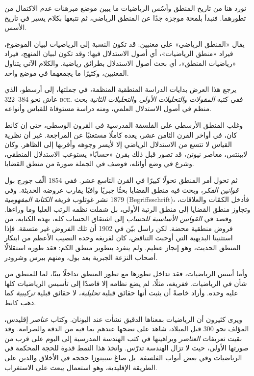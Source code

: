 \documentclass[../../../include/open-logic-section]{subfiles}
\begin{document}


نورد هنا من تاريخ المنطق وأسُس الرياضيات ما يبين موضع مبرهنات
عدم الاكتمال من تطورهما. فنبدأ بلمحة موجزة جدًا عن المنطق الرياضي،
ثم نتبعها بكلام يسير في تاريخ الأسس.

\begin{digress}
  يقال «المنطق الرياضي» على معنيين: قد تكون النسبة إلى الرياضيات
  لبيان الموضوع، فيراد «منطق الرياضيات»، أي أصول الاستدلال فيها؛
  وقد تكون لبيان المنهج، فيراد «رياضيات المنطق»، أي بحث أصول
  الاستدلال بطرائق رياضية. والكلام الآتي يتناول المعنيين، وكثيرًا
  ما يجمعهما في موضع واحد.
\end{digress}

يرجع هذا العرض بدايات الدراسة المنطقية المنظمة، في جملتها،
إلى أرسطو، الذي عاش نحو 384--322 \textsc{bce}. ففي كتبه
\emph{المقولات} و\emph{التحليلات الأولى} و\emph{التحليلات الثانية}
بحث منظم في أصول الاستدلال العلمي، ومنه دراسة مستوفاة للقياس
وأنواعه.

وغلب المنطق الأرسطي على الفلسفة المدرسية في القرون الوسطى،
حتى إن كانط كان، في أواخر القرن الثامن عشر، يعده كاملًا مستغنيًا
عن المراجعة. غير أن نظرية القياس لا تتسع من الاستدلال الرياضي
إلا لأيسر وجوهه وأقربها إلى الظاهر. وكان لايبنتس، معاصر نيوتن،
قد تصور قبل ذلك بقرن «حسابًا» يستوعب الاستدلال المنطقي، وشرع في
وضع أوائله، فوصف في الجملة صورة من منطق القضايا.

ثم تحول أمر المنطق تحولًا كبيرًا في القرن التاسع عشر. ففي
1854 ألّف جورج بول \emph{قوانين الفكر}، وبحث فيه منطق القضايا
بحثًا جبريًا وافيًا يقارب عروضه الحديثة. وفي 1879 نشر غوتلوب
فريغه \emph{الكتابة المفهومية} (Begriffsschrift)، فأدخل الكمّات
والعلاقات، وتجاوز منطق القضايا إلى منطق الرتبة الأولى، بل شملت
نظمه الرتب العليا وما وراءها. وقصد في \emph{القوانين الأساسية للحساب}
إلى اشتقاق الحساب كله، بهذه الكتابة، من فروض منطقية محضة.
لكن راسل بيّن في 1902 أن تلك الفروض غير متسقة. فإذا استثنينا
البديهية التي أوجبت التناقض، كان لفريغه وحده النصيب الأعظم من
ابتكار المنطق الحديث، وهو إنجاز عظيم. ولم ينفرد بتطوير منطق الكم:
فقد طوره استقلالًا أصحاب النزعة الجبرية بعد بول، ومنهم بيرس وشرودر.

وأما أسس الرياضيات، فقد تداخل تطورها مع تطور المنطق تداخلًا
بينًا، لما للمنطق من شأن في الرياضيات. ففريغه، مثلًا، لم يضع
نظامه إلا قاصدًا إلى تأسيس الرياضيات كلها عليه وحده. وأراد خاصةً
أن يثبت أنها حقائق قبلية \emph{تحليلية}، لا حقائق قبلية
\emph{تركيبية} كما ذهب كانط.

ويرى كثيرون أن الرياضيات بمعناها الدقيق نشأت عند اليونان.
وكتاب \emph{عناصر} إقليدس، المؤلف نحو 300 قبل الميلاد،
شاهد على نضجها عندهم بما فيه من الدقة والصرامة. وقد بقيت
تعريفات \emph{العناصر} وبراهينها في كتب الهندسة المدرسية
إلى اليوم على قرب من صورتها الأولى، حيث لا تزال الهندسة
تدرّس. واتخذ هذا النمط قدوة للحجة المحكمة في الرياضيات وفي
بعض أبواب الفلسفة. بل صاغ سبينوزا حججه في الأخلاق والدين
على الطريقة الإقليدية، وهو استعمال يبعث على الاستغراب.
\end{document}
